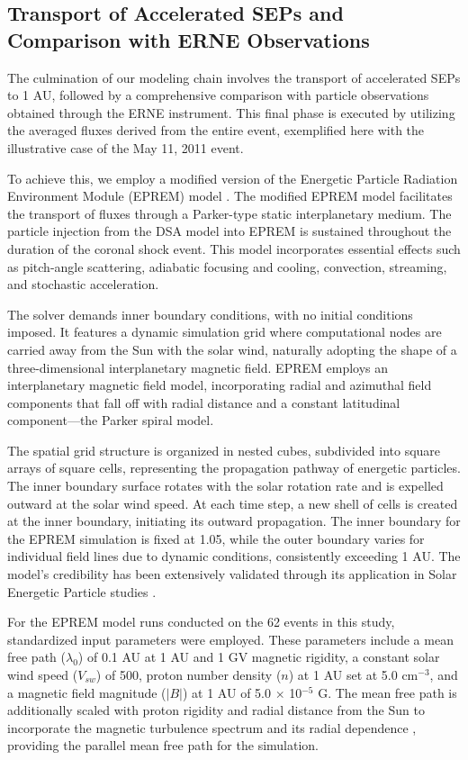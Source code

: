 \subsection{Transport of Accelerated SEPs and Comparison with ERNE Observations}
The culmination of our modeling chain involves the transport of accelerated SEPs to 1 AU, followed by a comprehensive comparison with particle observations obtained through the ERNE instrument. This final phase is executed by utilizing the averaged fluxes derived from the entire event, exemplified here with the illustrative case of the May 11, 2011 event.

To achieve this, we employ a modified version of the Energetic Particle Radiation Environment Module (EPREM) model \citep{schwadron_2010}. The modified EPREM model facilitates the transport of fluxes through a Parker-type static interplanetary medium. The particle injection from the DSA model into EPREM is sustained throughout the duration of the coronal shock event. This model incorporates essential effects such as pitch-angle scattering, adiabatic focusing and cooling, convection, streaming, and stochastic acceleration.

The solver demands inner boundary conditions, with no initial conditions imposed. It features a dynamic simulation grid where computational nodes are carried away from the Sun with the solar wind, naturally adopting the shape of a three-dimensional interplanetary magnetic field. EPREM employs an interplanetary magnetic field model, incorporating radial and azimuthal field components that fall off with radial distance and a constant latitudinal component—the Parker spiral model.

The spatial grid structure is organized in nested cubes, subdivided into square arrays of square cells, representing the propagation pathway of energetic particles. The inner boundary surface rotates with the solar rotation rate and is expelled outward at the solar wind speed. At each time step, a new shell of cells is created at the inner boundary, initiating its outward propagation. The inner boundary for the EPREM simulation is fixed at 1.05\rsun, while the outer boundary varies for individual field lines due to dynamic conditions, consistently exceeding 1 AU. The model's credibility has been extensively validated through its application in Solar Energetic Particle studies \citep{kozarev_2010, schwadron_2014}.

For the EPREM model runs conducted on the 62 events in this study, standardized input parameters were employed. These parameters include a mean free path ($\lambda_0$) of 0.1 AU at 1 AU and 1 GV magnetic rigidity, a constant solar wind speed ($V_{sw}$) of 500\kms, proton number density ($n$) at 1 AU set at 5.0 cm$^{-3}$, and a magnetic field magnitude ($|B|$) at 1 AU of 5.0 $\times$ 10$^{-5}$ G. The mean free path is additionally scaled with proton rigidity and radial distance from the Sun to incorporate the magnetic turbulence spectrum and its radial dependence \citep{zank_1998, li_2003, sokolov_2004, verkhoglyadova_2009}, providing the parallel mean free path for the simulation.

